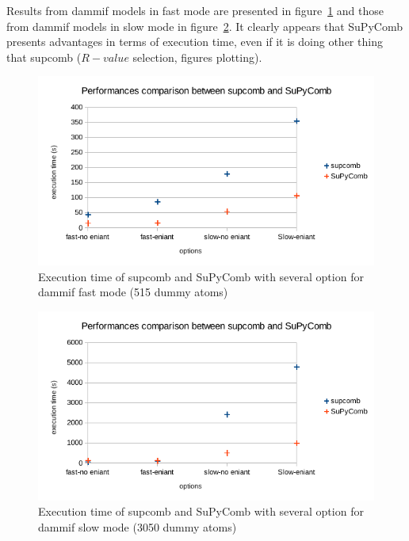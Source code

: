 \documentclass[a4paper, 11pt]{report}
\begin{document}
Results from dammif models in fast mode are presented in 
figure~\ref{fgr:perfdamfast} and those from dammif models in slow mode 
in figure~\ref{fgr:perfdamslow}. 
It clearly appears that SuPyComb presents advantages in terms of 
execution time, even if it is doing other thing that supcomb 
($R-value$ selection, figures plotting).

\begin{figure}
\includegraphics[scale=0.8]{perfdamfast.png}
\caption{Execution time of supcomb and SuPyComb with several option 
  for dammif fast mode (515 dummy atoms)}
\label{fgr:perfdamfast}
\end{figure} \vfill
\begin{figure}
\includegraphics[scale=0.8]{perfdamslow.png}
\caption{Execution time of supcomb and SuPyComb with several option 
  for dammif slow mode (3050 dummy atoms)}
\label{fgr:perfdamslow}
\end{figure}
\end{document}
